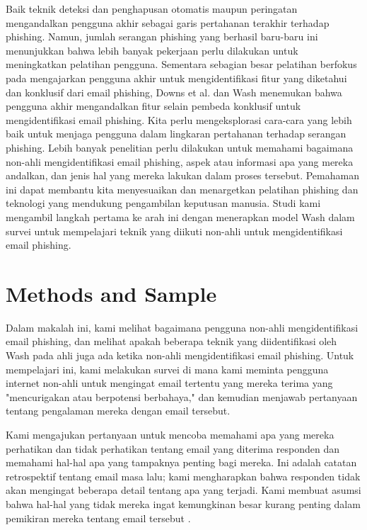 \documentclass[lettersize,journal]{IEEEtran}
\begin{document}
Baik teknik deteksi dan penghapusan otomatis maupun peringatan mengandalkan
pengguna akhir sebagai garis pertahanan terakhir terhadap phishing. Namun,
jumlah serangan phishing yang berhasil baru-baru ini menunjukkan bahwa lebih
banyak pekerjaan perlu dilakukan untuk meningkatkan pelatihan pengguna.
Sementara sebagian besar pelatihan berfokus pada mengajarkan pengguna akhir
untuk mengidentifikasi fitur yang diketahui dan konklusif dari email phishing,
Downs et al. \cite{tujuh} dan Wash \cite{tigaempat} menemukan bahwa pengguna
akhir mengandalkan fitur selain pembeda konklusif untuk mengidentifikasi email
phishing. Kita perlu mengeksplorasi cara-cara yang lebih baik untuk menjaga
pengguna dalam lingkaran pertahanan terhadap serangan phishing. Lebih banyak
penelitian perlu dilakukan untuk memahami bagaimana non-ahli mengidentifikasi
email phishing, aspek atau informasi apa yang mereka andalkan, dan jenis hal
yang mereka lakukan dalam proses tersebut. Pemahaman ini dapat membantu kita
menyesuaikan dan menargetkan pelatihan phishing dan teknologi yang mendukung
pengambilan keputusan manusia. Studi kami mengambil langkah pertama ke arah ini
dengan menerapkan model Wash dalam survei untuk mempelajari teknik yang diikuti
non-ahli untuk mengidentifikasi email phishing.

\section{Methods and Sample}

Dalam makalah ini, kami melihat bagaimana pengguna non-ahli mengidentifikasi
email phishing, dan melihat apakah beberapa teknik yang diidentifikasi oleh
Wash \cite{tigaempat} pada ahli juga ada ketika non-ahli mengidentifikasi email
phishing. Untuk mempelajari ini, kami melakukan survei di mana kami meminta
pengguna internet non-ahli untuk mengingat email tertentu yang mereka terima
yang "mencurigakan atau berpotensi berbahaya," dan kemudian menjawab pertanyaan
tentang pengalaman mereka dengan email tersebut.

Kami mengajukan pertanyaan untuk mencoba memahami apa yang mereka perhatikan
dan tidak perhatikan tentang email yang diterima responden dan memahami hal-hal
apa yang tampaknya penting bagi mereka. Ini adalah catatan retrospektif tentang
email masa lalu; kami mengharapkan bahwa responden tidak akan mengingat
beberapa detail tentang apa yang terjadi. Kami membuat asumsi bahwa hal-hal
yang tidak mereka ingat kemungkinan besar kurang penting dalam pemikiran mereka
tentang email tersebut \cite{satudelapan}.
\end{document}
